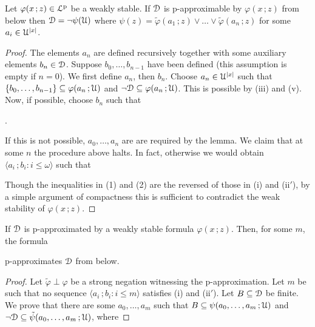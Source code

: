 \documentclass{amsproc}
\begin{document}
{\begin{lemma}
  Let $\varphi(x\,;z)\in{\EuScript L}^{\rm p}$ be a weakly stable.
  If ${\EuScript D}$ is p-approximable by $\varphi(x\,;z)$ from below then ${\EuScript D}=\neg\psi({\EuScript U})$ where $\psi(z)=\tilde\varphi(a_1\,;z)\vee\dots\vee\tilde\varphi(a_n\,;z)$ for some $a_i\in{\EuScript U}^{|x|}$.
\end{lemma}

\begin{proof}
  The elements $a_n$ are defined recursively together with some auxiliary elements $b_n\in{\EuScript D}$.
  Suppose $b_0,\dots,b_{n-1}$ have been defined (this assumption is empty if $n=0$).
  We first define $a_n$, then $b_n$.
  Choose $a_n\in{\EuScript U}^{|x|}$ such that $\{b_0,\dots,b_{n-1}\}\subseteq\varphi(a_n\,;{\EuScript U})$ and $\neg{\EuScript D}\subseteq\varphi(a_n\,;{\EuScript U})$.
  This is possible by (iii) and (v).
  Now, if possible, choose $b_n$ such that

  .

  If this is not possible, $a_0,\dots,a_n$ are are required by the lemma.
  We claim that at some $n$ the procedure above halts.
  In fact, otherwise we would obtain $\langle a_i\,;b_i : i\le \omega\rangle$ such that
  

  
  Though the inequalities in (1) and (2) are the reversed of those in (i) and (ii$'$), by a simple argument of compactness this is sufficient to contradict the weak stability of $\varphi(x\,;z)$.
\end{proof}

\begin{lemma}
  If ${\EuScript D}$ is p-approximated by a weakly stable formula $\varphi(x\,;z)$.
  Then, for some $m$, the formula 


  p-approximates ${\EuScript D}$ from below.
\end{lemma}

\begin{proof}
  Let $\tilde\varphi\perp\varphi$ be a strong negation witnessing the p-approximation.
  Let $m$ be such that no sequence $\langle a_i\,;b_i : i\le m\rangle$ satisfies (i) and (ii$'$).
  Let $B\subseteq{\EuScript D}$ be finite.
  We prove that there are some $a_0,\dots,a_m$ such that $B\subseteq\psi(a_0,\dots,a_m\,;{\EuScript U})$ and $\neg{\EuScript D}\subseteq\tilde\psi(a_0,\dots,a_m\,;{\EuScript U})$, where


\end{proof}}
\end{document}
